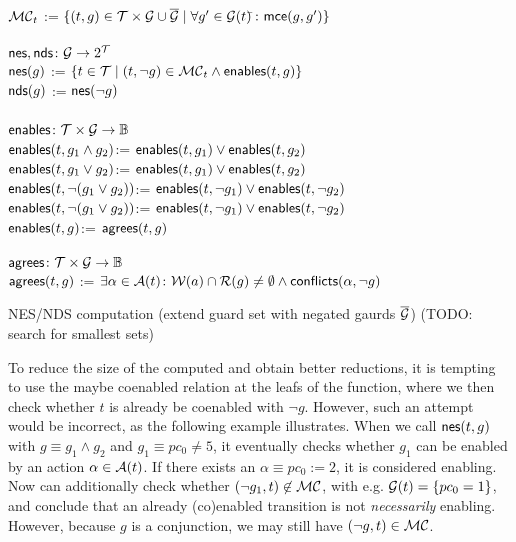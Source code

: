 \documentclass{paper}
\begin{document}
\begin{algorithm}[p]
\begin{ntabbing}\hspace{-.8ex}
$\mathcal{MC}_t$ := $\{ (t,g)\in\mathcal{T}\times\mathcal{G}\cup\overline{\mathcal{G}} \mid
\forall g'\in\mathcal{G}(t)$\=$\colon \textsf{mce}(g,g') \}$
\label{}\\
\\
$\textsf{nes},\textsf{nds}\colon \mathcal{G} \rightarrow 2^\mathcal{T}$\=\label{}\\
$\textsf{nes}(g)$ \>:= $\{ t\in \mathcal{T} \mid (t, \neg g)\in\mathcal{MC}_t
\land \textsf{enables}(t, g) \}$
\label{}\\
$\textsf{nds}(g)$ \>:= $\textsf{nes}(\neg g) $
\label{}\\
\\
$\textsf{enables}\colon\mathcal{T} \times \mathcal{G} \rightarrow \mathbb{B}$~~~~~~\=
\label{}\\
$\textsf{enables}(t,g_1\land g_2)$\>:= $\textsf{enables}(t,g_1)\lor\textsf{enables}(t,g_2)$
\label{}\\
$\textsf{enables}(t,g_1\lor g_2)$\>:= $\textsf{enables}(t,g_1)\lor\textsf{enables}(t,g_2)$
\label{}\\
$\textsf{enables}(t,\neg(g_1\lor g_2))$\>:=
$\textsf{enables}(t,\neg g_1)\lor\textsf{enables}(t, \neg g_2)$
\label{}\\
$\textsf{enables}(t,\neg(g_1\lor g_2))$\>:=
$\textsf{enables}(t,\neg g_1)\lor\textsf{enables}(t, \neg g_2)$
\label{}\\
$\textsf{enables}(t, g)$\>:= $\textsf{agrees}(t, g)$
\label{}\\
\\
$\textsf{agrees}\colon \mathcal{T} \times \mathcal{G} \rightarrow \mathbb{B}$
\label{}\\
$\textsf{agrees}(t, g)$ := $\exists \alpha\in\mathcal{A}(t)\colon
\mathcal{W}(a)\cap\mathcal{R}(g)\neq\emptyset \land \textsf{conflicts}(\alpha,\neg g)$
\label{}\\
\end{ntabbing}\vspace{-2em}
\caption{NES/NDS computation (extend guard set with negated gaurds
$\overline{\mathcal{G}}$) (TODO: search for smallest sets)}
\end{algorithm}

\newpage 


To reduce the size of the computed \nes and obtain better reductions,
it is tempting to
use the maybe coenabled relation at the leafs of
the \agrees function, where we then check whether $t$ is already
be coenabled with $\neg g$. However, such an attempt would be incorrect,
as the following example illustrates. When we call
$\textsf{nes}(t,g)$ with $g \equiv g_1 \land g_2$ and $g_1 \equiv pc_0 \neq 5$,
it eventually checks whether $g_1$
can be enabled by an action $\alpha\in\mathcal{A}(t)$.
If there exists an $\alpha \equiv pc_0 := 2$, it is considered enabling. 
Now \agrees can additionally check whether
$(\neg g_1, t) \not\in \mathcal{MC}$, with e.g. $\mathcal{G}(t) = \{pc_0=1\}$,
and conclude that an already (co)enabled
transition is not \emph{necessarily} enabling.
However, because $g$ is a conjunction,
we may still have $(\neg g, t)\in\mathcal{MC}$.
\end{document}
